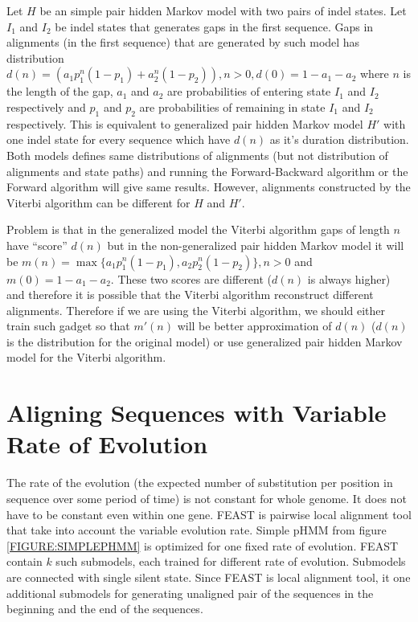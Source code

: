 Let $H$ be an simple pair hidden Markov model with two pairs of indel states.
Let $I_1$ and $I_2$ be indel states that generates gaps in the first sequence.
Gaps in alignments (in the first sequence) that are generated by such model has
distribution $d(n)=(a_1p_1^n(1-p_1)+a_2^n(1-p_2)), n>0, d(0)=1-a_1-a_2$ where
$n$ is the length of the gap, $a_1$ and $a_2$ are probabilities of entering
state $I_1$ and $I_2$ respectively and $p_1$ and $p_2$ are probabilities of
remaining in state $I_1$ and $I_2$ respectively. This is equivalent to
generalized pair hidden Markov model $H'$ with one indel state for every
sequence which have $d(n)$ as it's duration distribution. Both models defines
same distributions of alignments (but not distribution of alignments and state
paths) and running the Forward-Backward algorithm or the Forward algorithm will 
give same results. However, alignments constructed by the Viterbi algorithm
can be different for $H$ and $H'$.

Problem is that in the generalized model the Viterbi algorithm gaps of length
$n$ have ``score'' $d(n)$ but in the non-generalized pair hidden Markov model it
will be $m(n)=\max\{a_1p_1^n(1-p_1),a_2p_2^n(1-p_2)\}, n>0$ and
$m(0)=1-a_1-a_2$.  These two scores are different ($d(n)$ is always higher) and
therefore it is possible that the Viterbi algorithm reconstruct different
alignments. Therefore if we are using the Viterbi algorithm, we should either
train such gadget so that $m'(n)$ will be better approximation of $d(n)$ ($d(n)$
is the distribution for the original model) or use generalized pair hidden
Markov model for the Viterbi algorithm.


\section{Aligning Sequences with Variable Rate of Evolution}
\label{SECTION:FEAST} 

The rate of the evolution (the expected number of substitution per position in
sequence over some period of time) is not constant for whole genome. It does not
have to be constant even within one gene. FEAST is pairwise local alignment tool
\cite{FEAST2011} that take into account the variable evolution rate. Simple pHMM
from figure \ref{FIGURE:SIMPLEPHMM} is optimized for one fixed rate of
evolution.  FEAST contain $k$ such submodels, each trained for different rate of
evolution.  Submodels are connected with single silent state.  Since FEAST is
local alignment tool, it one additional submodels for generating unaligned pair
of the sequences in the beginning and the end of the sequences.

